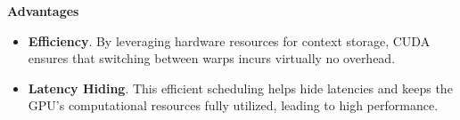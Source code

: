 \begin{flushleft}
    \textcolor{Green3}{ \textbf{Advantages}}
\end{flushleft}
\begin{itemize}
    \item \textcolor{Green3}{\textbf{Efficiency}}. By leveraging hardware resources for context storage, CUDA ensures that switching between warps incurs virtually no overhead.
    
    \item \textcolor{Green3}{\textbf{Latency Hiding}}. This efficient scheduling helps hide latencies and keeps the GPU's computational resources fully utilized, leading to high performance.
\end{itemize}

\newpage

